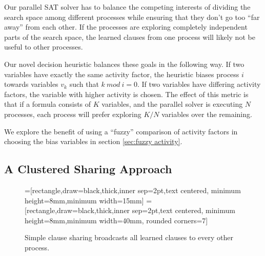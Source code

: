 \documentclass[letterpaper, compsoc, conference]{IEEEtran}
\begin{document}
Our parallel SAT solver has to balance the competing interests of dividing the
search space among different processes while ensuring that they don't go too
``far away'' from each other. If the processes are exploring completely
independent parts of the search space, the learned clauses from one process
will likely not be useful to other processes. 

Our novel decision heuristic balances these goals in the following way.  If
two variables have exactly the same activity factor, the heuristic biases
process $i$ towards variables $v_k$ such that $k~mod~i=0$. If two variables
have differing activity factors, the variable with higher activity is chosen.
The effect of this metric is that if a formula consists of $K$ variables,
and the parallel solver is executing $N$ processes, each process will prefer
exploring $K/N$ variables over the remaining. 

We explore the benefit of using a ``fuzzy'' comparison of activity factors
in choosing the bias variables in section \ref{sec:fuzzy activity}.

\subsection{A Clustered Sharing Approach}
\label{sec:clustered sharing}

\begin{figure}[htbp]
    =[rectangle,draw=black,thick,inner sep=2pt,text centered,
                     minimum height=8mm,minimum width=15mm]
    =[rectangle,draw=black,thick,inner sep=2pt,text centered,
                        minimum height=8mm,minimum width=40mm, rounded corners=7]
    \begin{center}
    \end{center}
    \caption{Simple clause sharing broadcasts all learned clauses to every other process.}
    \label{fig:simple}
\end{figure}
\end{document}
